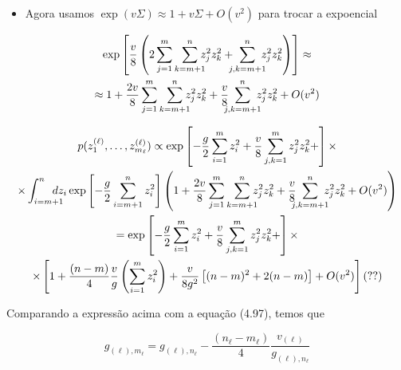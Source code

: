 \documentclass{beamer}
\def\eell{{(\ell)}}
\begin{document}
\begin{frame}
	\begin{itemize}
		\item Agora usamos $\exp(v\Sigma) \approx 1 + v\Sigma + O(v^2)$ para trocar a expoencial
	\end{itemize}
	\begin{multline*}
		\exp\left[ \frac{v}{8}\left(2\sum_{j=1}^{m}\sum_{k=m+1}^{n} \hspace*{-6pt}z_j^2z_k^2 + \hspace{-6pt}\sum_{j,k=m+1}^{n} \hspace{-6pt} z_j^2 z_k^2  \right)  \right] \approx\\
		\approx 1 + \frac{2v}{8}\sum_{j=1}^{m}\sum_{k=m+1}^{n} \hspace*{-6pt}z_j^2z_k^2 +  \frac{v}{8}\hspace{-6pt}\sum_{j,k=m+1}^{n} \hspace{-6pt} z_j^2 z_k^2   + O(v^2)
	\end{multline*}
\end{frame}

\begin{frame}
	\small
	\begin{multline*}
		p(z_1^\eell, \ldots, z_{m_\ell}^\eell ) \propto \exp\left[-\frac{g}{2}\sum_{i=1}^{m}  z_i^2  + \frac{v}{8}\sum_{j,k=1}^{m}  z_j^2z_k^2 + \right]\times\\
		\times \int_{i=m+1}^{n}\hspace{-12pt} dz_i \exp\left[ -\frac{g}{2}\sum_{i=m+1}^{n}  z_i^2 \right] 
		\left(1 + \frac{2v}{8}\sum_{j=1}^{m}\sum_{k=m+1}^{n} \hspace*{-6pt}z_j^2z_k^2 +  \frac{v}{8}\hspace{-6pt}\sum_{j,k=m+1}^{n} \hspace{-6pt} z_j^2 z_k^2   + O(v^2)\right)\\
		= \exp\left[-\frac{g}{2}\sum_{i=1}^{m}  z_i^2  + \frac{v}{8}\sum_{j,k=1}^{m}  z_j^2z_k^2 + \right]\times \\
		\times\left[1+ \frac{(n -m)}{4}\frac{v}{g}\left(\sum_{i=1}^m z_i^2\right) + \frac{v}{8g^2}\left[(n-m)^2 + 2(n-m)\right] + O(v^2)\right] (??)
	\end{multline*}
\end{frame}

\begin{frame}
	Comparando a expressão acima com a equação (4.97), temos que

	\begin{equation*}\tag{4.100}
		g_{\eell,m_\ell} = g_{\eell,n_\ell} - \frac{(n_\ell -m_\ell)}{4}\frac{v_{\eell}}{g_{\eell,n_\ell}}
	\end{equation*}  
\end{frame}
\end{document}
